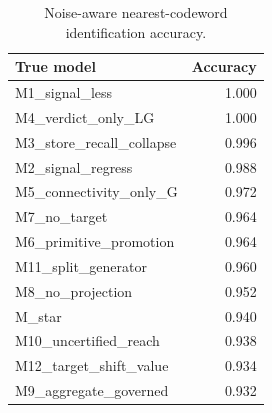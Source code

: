 \begin{table}[p]
\centering
\caption{Noise-aware nearest-codeword identification accuracy.}\label{tab:id}
\small
\begin{tabular}{lr}
\toprule True model & Accuracy \\ \midrule
M1\_signal\_less & 1.000 \\
M4\_verdict\_only\_LG & 1.000 \\
M3\_store\_recall\_collapse & 0.996 \\
M2\_signal\_regress & 0.988 \\
M5\_connectivity\_only\_G & 0.972 \\
M7\_no\_target & 0.964 \\
M6\_primitive\_promotion & 0.964 \\
M11\_split\_generator & 0.960 \\
M8\_no\_projection & 0.952 \\
M\_star & 0.940 \\
M10\_uncertified\_reach & 0.938 \\
M12\_target\_shift\_value & 0.934 \\
M9\_aggregate\_governed & 0.932 \\
\bottomrule
\end{tabular}
\end{table}

